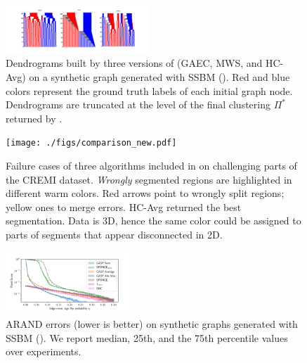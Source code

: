 \begin{figure}
\centering
\includegraphics[width=0.48\textwidth,trim=300 100 300 100, clip]{./figs/dendrograms/new_agglo_order.png} %
\caption{Dendrograms built by three versions of \algname{} (GAEC, MWS, and HC-Avg) on a synthetic graph generated with SSBM ().  Red and blue colors represent the ground truth labels of each initial graph node. Dendrograms are truncated at the level of the final clustering $\Pi^*$ returned by \algname{}. \label{fig:dendrograms}}
\end{figure}
\begin{figure}
\centering
\texttt{[image: ./figs/comparison\_new.pdf]} %
\caption{Failure cases of three algorithms included in \algname{} on challenging parts of the CREMI dataset. \emph{Wrongly} segmented regions are highlighted in different warm colors. Red arrows point to wrongly split regions; yellow ones to merge errors. HC-Avg returned the best segmentation. Data is 3D, hence the same color could be assigned to parts of segments that appear disconnected in 2D.  
\label{fig:failure_cases}}
\end{figure}
\begin{figure}[t]
\centering
\includegraphics[width=0.42\textwidth,trim=0.25in 0.in 0.5in 0.in,clip]{./figs/SSBM_experiments.pdf}
        \caption{
ARAND errors (lower is better) on synthetic graphs generated with SSBM (). 
We report median, 25th, and the 75th percentile values over  experiments.
        } \label{fig:SSBM_scores}
\end{figure}



